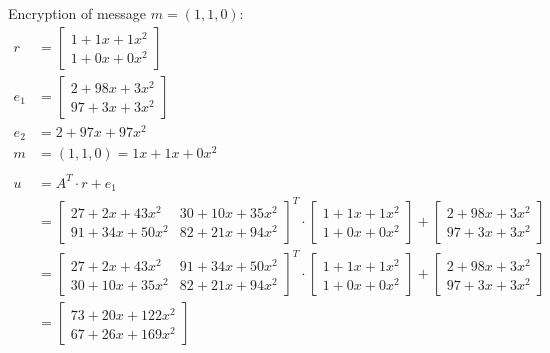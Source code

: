 Encryption of message $m=(1,1,0)$:
\begin{align*}
  r       & = \begin{bmatrix}1+1x+1x^2 \\ 1+0x+0x^2 \end{bmatrix}                                       \\
  e_1     & = \begin{bmatrix}2+98x+3x^2 \\ 97+3x+3x^2 \end{bmatrix}                                     \\
  e_2     & = 2+97x+97x^2                                                                               \\
  m       & =(1,1,0) = 1x+1x+0x^2                                                                       \\
  \\
  u       & = A^T \cdot r + e_1                                                                         \\
          & = \begin{bmatrix}27+2x+43x^2 & 30+10x+35x^2 \\ 91+34x+50x^2 & 82+21x+94x^2 \end{bmatrix}^T
  \cdot
  \begin{bmatrix}1+1x+1x^2 \\ 1+0x+0x^2 \end{bmatrix}
  +
  \begin{bmatrix}2+98x+3x^2 \\ 97+3x+3x^2 \end{bmatrix}                                                 \\
          & = \begin{bmatrix}27+2x+43x^2 & 91+34x+50x^2 \\ 30+10x+35x^2  & 82+21x+94x^2 \end{bmatrix}^T
  \cdot
  \begin{bmatrix}1+1x+1x^2 \\ 1+0x+0x^2 \end{bmatrix}
  +
  \begin{bmatrix}2+98x+3x^2 \\ 97+3x+3x^2 \end{bmatrix}                                                 \\
          & = \begin{bmatrix}73+20x+122x^2 \\ 67+26x+169x^2 \end{bmatrix}

\end{align*}
